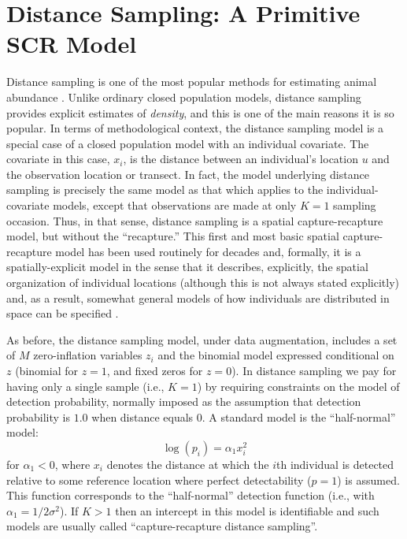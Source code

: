 \section{Distance Sampling: A Primitive SCR Model}

Distance sampling is one of the most popular methods for estimating
animal abundance \citep{burnham_etal:1980, buckland_etal:2001,
  buckland_etal:2004book}. Unlike ordinary closed population models,
distance sampling provides explicit estimates of {\it density}, and
this is one of the main reasons it is so popular.  In terms of
methodological context, the distance sampling model is a special case
of a closed population model with an individual covariate. The
covariate in this case, $x_{i}$, is the distance between an
individual's location $u$ and the observation location or transect. In
fact, the model underlying distance sampling is precisely the same
model as that which applies to the individual-covariate models, except
that observations are made at only $K=1$ sampling occasion. Thus, in
that sense, distance sampling is a spatial capture-recapture model,
but without the ``recapture.''  This first and most basic spatial
capture-recapture model has been used routinely for decades and,
formally, it is a spatially-explicit model in the sense that it
describes, explicitly, the spatial organization of individual
locations (although this is not always stated explicitly) and, as a
result, somewhat general models of how individuals are distributed in
space can be specified \citep{hedley_etal:1999, royle_etal:2004,
  johnson_etal:2010, niemi_fernandez:2010, sillett_etal:2012}.

As before, the distance sampling model, under data augmentation,
includes a set of $M$ zero-inflation variables $z_{i}$ and the
binomial model expressed conditional on $z$ (binomial for $z=1$, and
fixed zeros for $z=0$).  In distance sampling we pay for having only a
single sample (i.e., $K=1$) by requiring constraints on the model of
detection probability, normally imposed as the assumption that
detection probability is $1.0$ when distance equals 0.  A standard
model is the ``half-normal'' model:
\[
\log(p_{i}) = \alpha_{1} x_{i}^{2}
\]
for $\alpha_{1} < 0$, where $x_i$ denotes the distance at which the $i$th
individual is detected relative to some reference location where
perfect detectability ($p=1$) is assumed. This function corresponds to
the ``half-normal'' detection function (i.e., with $\alpha_{1} =
1/2\sigma^{2}$).  If $K>1$ then an intercept in this model is
identifiable and such models are usually called ``capture-recapture
distance sampling''\citep{alpizar_pollock:1996,borchers_etal:1998}.

